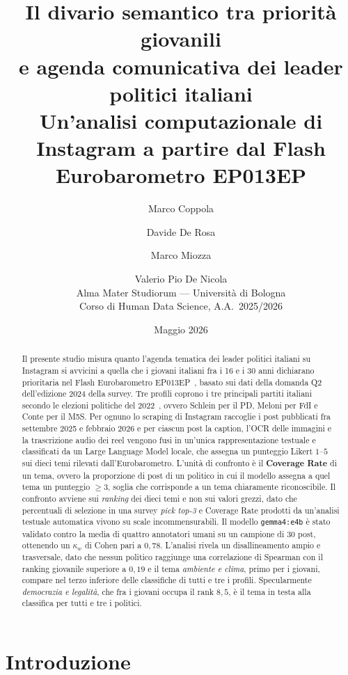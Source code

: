 \documentclass[11pt, a4paper]{article}
\title{\textbf{Il divario semantico tra priorit\`a giovanili\\
       e agenda comunicativa dei leader politici italiani}\\[0.4em]
       \large Un'analisi computazionale di Instagram a partire dal Flash
              Eurobarometro EP013EP}
\author{Marco Coppola \and Davide De Rosa \and Marco Miozza \and Valerio Pio De Nicola\\[0.3em]
  \small Alma Mater Studiorum --- Universit\`a di Bologna\\
  \small Corso di Human Data Science, A.A.\ 2025/2026}
\date{Maggio 2026}
\begin{document}
\maketitle

\begin{abstract}
\noindent
Il presente studio misura quanto l'agenda tematica dei leader politici
italiani su Instagram si avvicini a quella che i giovani italiani fra i 16
e i 30 anni dichiarano prioritaria nel Flash Eurobarometro
EP013EP~\cite{ep2024youth}, basato sui dati della domanda Q2 dell'edizione
2024 della survey. Tre profili coprono i tre principali partiti italiani
secondo le elezioni politiche del 2022~\cite{italianelections2022}, ovvero
Schlein per il PD, Meloni per FdI e Conte per il M5S. Per ognuno lo
scraping di Instagram raccoglie i post pubblicati fra settembre 2025 e
febbraio 2026 e per ciascun post la caption, l'OCR delle immagini e la
trascrizione audio dei reel vengono fusi in un'unica rappresentazione
testuale e classificati da un Large Language Model locale, che assegna un
punteggio Likert $1$--$5$ sui dieci temi rilevati dall'Eurobarometro.
L'unit\`a di confronto \`e il \textbf{Coverage Rate} di un tema, ovvero la
proporzione di post di un politico in cui il modello assegna a quel tema
un punteggio $\geq 3$, soglia che corrisponde a un tema chiaramente
riconoscibile. Il confronto avviene sui \textit{ranking} dei dieci temi e
non sui valori grezzi, dato che percentuali di selezione in una survey
\textit{pick top-3} e Coverage Rate prodotti da un'analisi testuale
automatica vivono su scale incommensurabili. Il modello
\texttt{gemma4:e4b} \`e stato validato contro la media di quattro
annotatori umani su un campione di $30$ post, ottenendo un $\kappa_w$ di
Cohen pari a $0{,}78$. L'analisi rivela un disallineamento ampio e
trasversale, dato che nessun politico raggiunge una correlazione di
Spearman con il ranking giovanile superiore a $0{,}19$ e il tema
\emph{ambiente e clima}, primo per i giovani, compare nel terzo inferiore
delle classifiche di tutti e tre i profili. Specularmente
\emph{democrazia e legalit\`a}, che fra i giovani occupa il rank
$8{,}5$, \`e il tema in testa alla classifica per tutti e tre i politici.
\end{abstract}

\section{Introduzione}
\end{document}
